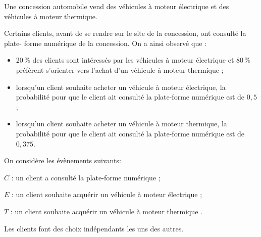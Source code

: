 \medskip

Une concession automobile vend des véhicules à moteur électrique et des véhicules à moteur thermique.

Certains clients, avant de se rendre sur le site de la concession, ont consulté la plate- forme numérique de la concession. On a ainsi observé que :
\begin{itemize}
\item[$\bullet$~~]20\,\% des clients sont intéressés par les véhicules à moteur électrique et 80\,\% préfèrent s'orienter vers l'achat d'un véhicule à moteur thermique ;
\item[$\bullet$~~]lorsqu'un client souhaite acheter un véhicule à moteur électrique, la probabilité pour que le client ait consulté la plate-forme numérique est de $0,5$ ;
\item[$\bullet$~~]lorsqu'un client souhaite acheter un véhicule à moteur thermique, la probabilité pour que le client ait consulté la plate-forme numérique est de $0,375$.
\end{itemize}

\begin{list}{\textbullet}{On considère les évènements suivants:}
\item $C$ : \og un client a consulté la plate-forme numérique \fg{} ;
\item $E$ : \og un client souhaite acquérir un véhicule à moteur électrique \fg{} ;
\item $T$ : \og un client souhaite acquérir un véhicule à moteur thermique \fg.
\end{list}

Les clients font des choix indépendants les uns des autres.

\medskip

